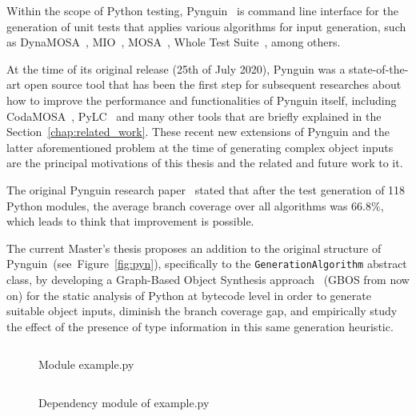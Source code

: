 \documentclass[%
  chapterprefix=false,%
  open=right,%
  twoside=true,%
  paper=a4,%
  logofile={Figures/logo.png},%
  thesistype=master,%
  UKenglish,%
]{se2thesis}
\newcommand{\classname}[1]{\texttt{#1}}
\begin{document}
Within the scope of Python testing, Pynguin~\cite{DBLP:conf/icse/LukasczykF22} is command line interface for the generation of unit tests that applies various algorithms for input generation, such as DynaMOSA~\cite{DBLP:journals/tse/PanichellaKT18}, MIO~\cite{DBLP:conf/ssbse/Arcuri17}, MOSA~\cite{DBLP:conf/icst/PanichellaKT15}, Whole Test Suite~\cite{DBLP:journals/tse/FraserA13}, among others.

At the time of its original release (25th of July 2020), Pynguin was a state-of-the-art open source tool that has been the first step for subsequent researches about how to improve the performance and functionalities of Pynguin itself, including CodaMOSA~\cite{DBLP:conf/icse/LemieuxILS23}, PyLC~\cite{DBLP:conf/sac/SalariEAS23} and many other tools that are briefly explained in the Section~\ref{chap:related_work}.
These recent new extensions of Pynguin and the latter aforementioned problem at the time of generating complex object inputs are the principal motivations of this thesis and the related and future work to it.

The original Pynguin research paper~\cite{DBLP:conf/icse/LukasczykF22} stated that after the test generation of 118 Python modules, the average branch coverage over all algorithms was $66.8\%$, which leads to think that improvement is possible.

The current Master's thesis proposes an addition to the original structure of Pynguin~(see~Figure~\ref{fig:pyn}), specifically to the \classname{GenerationAlgorithm} abstract class, by developing a Graph-Based Object Synthesis approach~\cite{DBLP:conf/sigsoft/0001O00D21} (GBOS from now on) for the static analysis of Python at bytecode level in order to generate suitable object inputs, diminish the branch coverage gap, and empirically study the effect of the presence of type information in this same generation heuristic.

\begin{figure}
    \inputminted[linenos]{python}{Figures/example.py}
    \caption{Module example.py\label{lst:1}}
\end{figure}

\begin{figure}
  \inputminted[linenos]{python}{Figures/dependencies.py}
  \caption{Dependency module of example.py\label{lst:2}}
\end{figure}
\end{document}
